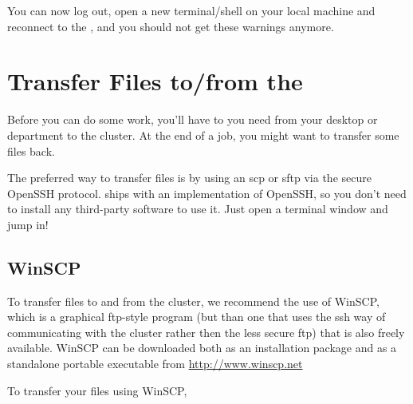 \begin{prompt}
\end{prompt}

You can now log out, open a new terminal/shell on your local machine and reconnect to the \hpc, and you should not get these
warnings anymore.

\fi
\section{Transfer Files to/from the \hpc}
\hypertarget{sec:filetransfer}{}


Before you can do some work, you'll have to 
you need from your desktop or department to the cluster. At the end of a job,
you might want to transfer some files back.

\ifmacORlinux
The preferred way to transfer files is by using an scp or sftp via the secure
OpenSSH protocol.  \OS  ships with an implementation of
OpenSSH, so you don't need to install any third-party software to use it. Just
open a terminal window and jump in!
\fi

\ifwindows
  \subsection{WinSCP}

  To transfer files to and from the cluster, we recommend the use of WinSCP,
  which is a graphical ftp-style program (but than one that uses the ssh way of
  communicating with the cluster rather then the less secure ftp) that is also
  freely available. WinSCP can be downloaded both as an installation package
  and as a standalone portable executable from \url{http://www.winscp.net}

  To transfer your files using WinSCP,

